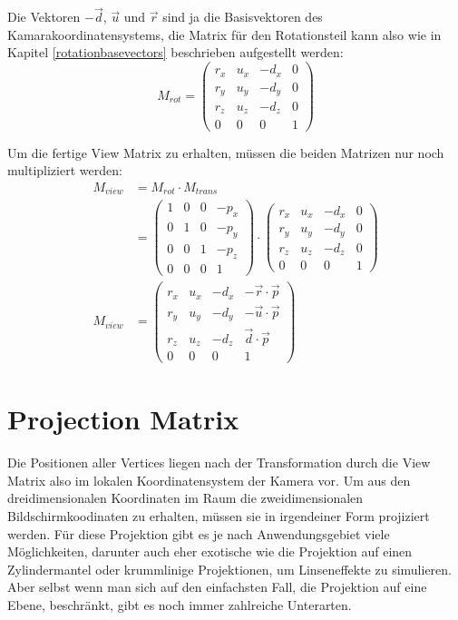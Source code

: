 Die Vektoren $-\vec d$, $\vec u$ und $\vec r$ sind ja die Basisvektoren des Kamarakoordinatensystems, die Matrix für den Rotationsteil kann also wie in Kapitel \ref{rotationbasevectors} beschrieben aufgestellt werden:
\begin{equation}
 M_{rot} =
 \begin{pmatrix}
  r_x & u_x & -d_x & 0 \\
  r_y & u_y & -d_y & 0 \\
  r_z & u_z & -d_z & 0 \\
  0 & 0 & 0 & 1
 \end{pmatrix}
\end{equation}

Um die fertige View Matrix zu erhalten, müssen die beiden Matrizen nur noch multipliziert werden:
\begin{equation}
\begin{split}
 M_{view} &= M_{rot} \cdot M_{trans} \\
 &=
 \begin{pmatrix}
  1 & 0 & 0 & -p_x \\
  0 & 1 & 0 & -p_y \\
  0 & 0 & 1 & -p_z \\
  0 & 0 & 0 & 1
 \end{pmatrix} \cdot
 \begin{pmatrix}
  r_x & u_x & -d_x & 0 \\
  r_y & u_y & -d_y & 0 \\
  r_z & u_z & -d_z & 0 \\
  0 & 0 & 0 & 1
 \end{pmatrix} \\
 M_{view} &=
 \begin{pmatrix}
  r_x & u_x & -d_x & -\vec r \cdot \vec p \\
  r_y & u_y & -d_y & -\vec u \cdot \vec p \\
  r_z & u_z & -d_z & \vec d \cdot \vec p \\
  0 & 0 & 0 & 1
 \end{pmatrix}
\end{split}
\end{equation}

\section{Projection Matrix}
\label{projection}
Die Positionen aller Vertices liegen nach der Transformation durch die View Matrix also im lokalen Koordinatensystem der Kamera vor. Um aus den dreidimensionalen Koordinaten im Raum die zweidimensionalen Bildschirmkoodinaten zu erhalten, müssen sie in irgendeiner Form projiziert werden. Für diese Projektion gibt es je nach Anwendungsgebiet viele Möglichkeiten, darunter auch eher exotische wie die Projektion auf einen Zylindermantel oder krummlinige Projektionen, um Linseneffekte zu simulieren. Aber selbst wenn man sich auf den einfachsten Fall, die Projektion auf eine Ebene, beschränkt, gibt es noch immer zahlreiche Unterarten. 

